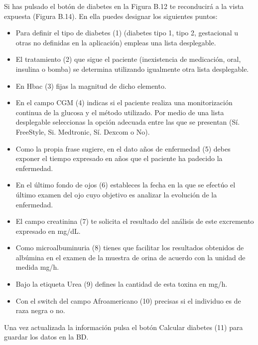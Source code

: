 \documentclass[11pt,spanish,
		listoftables,listoffigures]
		{tfgplantilla}
\begin{document}
Si has pulsado el botón de diabetes en la Figura B.12 te reconducirá a la vista expuesta (Figura B.14). En ella puedes designar los siguientes puntos:

\begin{itemize}
	\item Para definir el tipo de diabetes (1) (diabetes tipo 1, tipo 2, gestacional u otras no definidas en la aplicación) empleas una lista desplegable.

	\item El tratamiento (2) que sigue el paciente (inexistencia de medicación, oral, insulina o bomba) se determina utilizando igualmente otra lista desplegable.

	\item En Hbac (3) fijas la magnitud de dicho elemento.

	\item En el campo CGM (4) indicas si el paciente realiza una monitorización continua de la glucosa y el método utilizado. Por medio de una lista desplegable seleccionas la opción adecuada entre las que se presentan (Sí. FreeStyle, Si. Medtronic, Sí. Dexcom o No).

	\item Como la propia frase sugiere, en el dato años de enfermedad (5) debes exponer el tiempo expresado en años que el paciente ha padecido la enfermedad.

	\item En el último fondo de ojos (6) estableces la fecha en la que se efectúo el último examen del ojo cuyo objetivo es analizar la evolución de la enfermedad.

	\item El campo creatinina (7) te solicita el resultado del análisis de este excremento expresado en mg/dL.

	\item Como microalbuminuria (8) tienes que facilitar los resultados obtenidos de albúmina en el examen de la muestra de orina de acuerdo con la unidad de medida mg/h.

	\item Bajo la etiqueta Urea (9) defines la cantidad de esta toxina en mg/h.

	\item Con el switch del campo Afroamericano (10) precisas si el individuo es de raza negra o no.
\end{itemize}

Una vez actualizada la información pulsa el botón \textquotedbl Calcular diabetes\textquotedbl{} (11) para guardar los datos en la BD.
\end{document}
